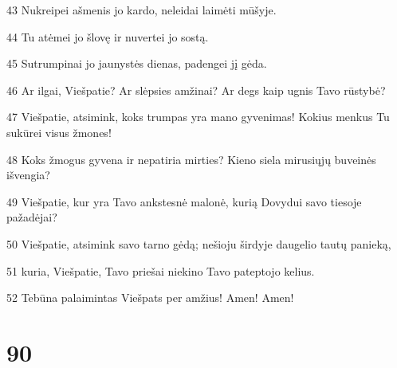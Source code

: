 \par 43 Nukreipei ašmenis jo kardo, neleidai laimėti mūšyje. 
\par 44 Tu atėmei jo šlovę ir nuvertei jo sostą. 
\par 45 Sutrumpinai jo jaunystės dienas, padengei jį gėda. 
\par 46 Ar ilgai, Viešpatie? Ar slėpsies amžinai? Ar degs kaip ugnis Tavo rūstybė? 
\par 47 Viešpatie, atsimink, koks trumpas yra mano gyvenimas! Kokius menkus Tu sukūrei visus žmones! 
\par 48 Koks žmogus gyvena ir nepatiria mirties? Kieno siela mirusiųjų buveinės išvengia? 
\par 49 Viešpatie, kur yra Tavo ankstesnė malonė, kurią Dovydui savo tiesoje pažadėjai? 
\par 50 Viešpatie, atsimink savo tarno gėdą; nešioju širdyje daugelio tautų panieką, 
\par 51 kuria, Viešpatie, Tavo priešai niekino Tavo pateptojo kelius. 
\par 52 Tebūna palaimintas Viešpats per amžius! Amen! Amen!


\chapter{90}



